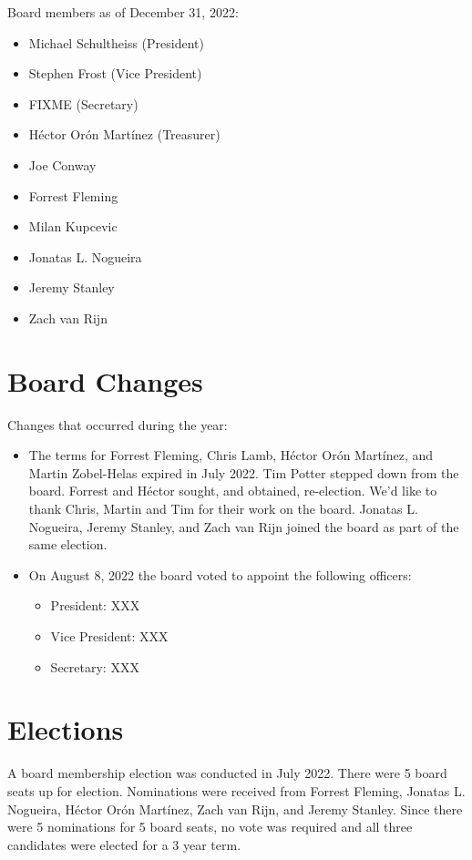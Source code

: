 \documentclass[a4paper]{report}
\begin{document}
Board members as of December 31, 2022:

\begin{itemize}
\item Michael Schultheiss (President)
\item Stephen Frost (Vice President)
\item FIXME (Secretary)
\item Héctor Orón Martínez (Treasurer)
\item Joe Conway
\item Forrest Fleming
\item Milan Kupcevic
\item Jonatas L. Nogueira
\item Jeremy Stanley
\item Zach van Rijn
\end{itemize}

\section{Board Changes}

Changes that occurred during the year:

\begin{itemize}

\item The terms for Forrest Fleming, Chris Lamb, Héctor Orón Martínez, and Martin Zobel-Helas expired in July 2022.  Tim Potter stepped down from the board.  Forrest and Héctor sought, and obtained, re-election.  We'd like to thank Chris, Martin and Tim for their work on the board.  Jonatas L. Nogueira, Jeremy Stanley, and Zach van Rijn joined the board as part of the same election.

\item On August 8, 2022 the board voted to appoint the following officers:

\begin{itemize}
\item President: XXX
\item Vice President: XXX
\item Secretary: XXX
\end{itemize}

\end{itemize}

\section{Elections}

A board membership election was conducted in July 2022.  There were 5 board seats up for election.  Nominations were received from Forrest Fleming, Jonatas L. Nogueira, Héctor Orón Martínez, Zach van Rijn, and Jeremy Stanley.  Since there were 5 nominations for 5 board seats, no vote was required and all three candidates were elected for a 3 year term.
\end{document}
